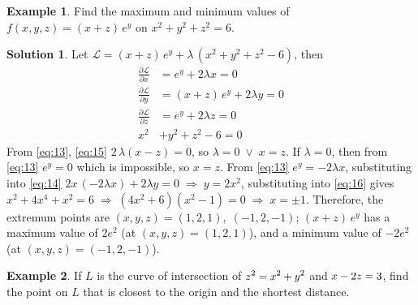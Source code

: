\documentclass[10pt]{extarticle}
\newcommand{\ds}{\displaystyle}
\newcommand{\ie}{\;\Longrightarrow\;}
\newcommand{\orr}{\;\vee\;}
\theoremstyle{definition}
\newtheorem*{ex}{Example}
\newtheorem*{sol}{Solution}
\newcommand{\pdiff}[2]{\frac{\partial #1}{\partial #2}}
\newcommand\scalemath[2]{\scalebox{#1}{\mbox{\ensuremath{\displaystyle #2}}}}
\begin{document}
\begin{ex}
  Find the maximum and minimum values of $\ds f(x, y, z) = (x + z)\,e^y$ on $x^2 + y^2 + z^2 = 6$. 
\end{ex}
  
\begin{sol}
  Let $\ds\mathcal{L} = (x + z)\,e^y + \lambda\,(x^2 + y^2 + z^2 - 6)$, then 
  \begin{align}
    \pdiff{\mathcal{L}}{x} &= e^y + 2\lambda x = 0\label{eq:13}\\
    \pdiff{\mathcal{L}}{y} &= (x + z)\,e^y + 2\lambda y = 0\label{eq:14} \\
    \pdiff{\mathcal{L}}{z} &= e^y + 2\lambda z = 0\label{eq:15} \\
    x^2 &+ y^2 + z^2 - 6 = 0 \label{eq:16}
  \end{align}
  From \eqref{eq:13}, \eqref{eq:15} $2\,\lambda(x - z) = 0$, so $\lambda = 0\orr x = z$. If $\lambda = 0$, then from \eqref{eq:13} $\ds e^y = 0$ which is impossible, so $x = z$. From \eqref{eq:13} $e^y = -2\lambda x$, substituting into \eqref{eq:14} $2x\,(-2\lambda x) + 2\lambda y = 0\ie y = 2x^2$, substituting into \eqref{eq:16} gives $x^2 + 4x^4 + x^2 = 6\ie (4x^2 + 6)(x^2 - 1) = 0 \ie x = \pm 1$. Therefore, the extremum points are $(x, y, z) = (1, 2, 1),\;(-1, 2, -1)$; $(x + z)\,e^y$ has a maximum value of $2e^2$ (at $(x, y, z) = (1, 2, 1)$), and a minimum value of $-2e^2$ (at $(x, y, z) = (-1, 2, -1)$). 
\end{sol}

\begin{ex}
  If $L$ is the curve of intersection of $\scalemath{0.95}{z^2 = x^2 + y^2}$ and $\scalemath{0.95}{x - 2z = 3}$, find the point on $L$ that is closest to the origin and the shortest distance. 
\end{ex}
\end{document}
